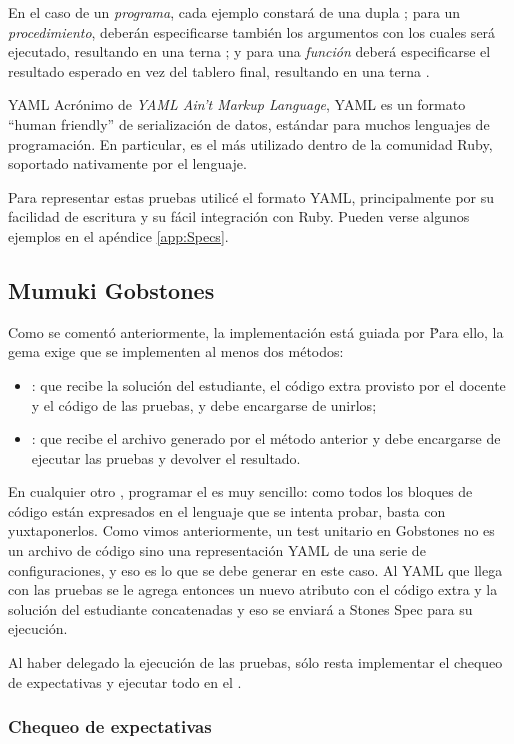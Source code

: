 En el caso de un \emph{programa}, cada ejemplo constará de una dupla ; para un \emph{procedimiento}, deberán especificarse también los argumentos con los cuales será ejecutado, resultando en una terna ; y para una \emph{función} deberá especificarse el resultado esperado en vez del tablero final, resultando en una terna .

\sepfootnotecontent
  {YAML}
  {Acrónimo de \emph{YAML Ain't Markup Language}, YAML es un formato ``human friendly'' de serialización de datos, estándar para muchos lenguajes de programación. En particular, es el más utilizado dentro de la comunidad Ruby, soportado nativamente por el lenguaje.}

Para representar estas pruebas utilicé el formato YAML, principalmente por su facilidad de escritura y su fácil integración con Ruby. Pueden verse algunos ejemplos en el apéndice \ref{app:Specs}.


\subsection{Mumuki Gobstones \runner}
Como se comentó anteriormente, la implementación está guiada por \mumukit\. Para ello, la gema exige que se implementen al menos dos métodos:
\begin{itemize}
  \item{: que recibe la solución del estudiante, el código extra provisto por el docente y el código de las pruebas, y debe encargarse de unirlos;}
  \item{: que recibe el archivo generado por el método anterior y debe encargarse de ejecutar las pruebas y devolver el resultado.}
\end{itemize}

En cualquier otro \runner, programar el  es muy sencillo: como todos los bloques de código están expresados en el lenguaje que se intenta probar, basta con yuxtaponerlos. Como vimos anteriormente, un test unitario en Gobstones no es un archivo de código sino una representación YAML de una serie de configuraciones, y eso es lo que se debe generar en este caso. Al YAML que llega con las pruebas se le agrega entonces un nuevo atributo  con el código extra y la solución del estudiante concatenadas y eso se enviará a Stones Spec para su ejecución.

Al haber delegado la ejecución de las pruebas, sólo resta implementar el chequeo de expectativas y ejecutar todo en el .

\subsubsection{Chequeo de expectativas}
